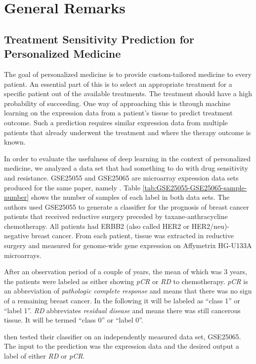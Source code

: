 
\section{General Remarks}

\subsection{Treatment Sensitivity Prediction for Personalized Medicine}

The goal of personalized medicine is to provide custom-tailored medicine
to every patient. An essential part of this is to select an appropriate
treatment for a specific patient out of the available treatments.
The treatment should have a high probability of succeeding. One way
of approaching this is through machine learning on the expression
data from a patient's tissue to predict treatment outcome. Such a
prediction requires similar expression data from multiple patients
that already underwent the treatment and where the therapy outcome
is known.

In order to evaluate the usefulness of deep learning in the context
of personalized medicine, we analyzed a data set that had something
to do with drug sensitivity and resistance. GSE25055 and GSE25065
are microarray expression data sets produced for the same paper, namely
\cite{HatzisSymmans2011}. Table \ref{tab:GSE25055-GSE25065-sample-number}
shows the number of samples of each label in both data sets. The authors
used GSE25055 to generate a classifier for the prognosis of breast
cancer patients that received reductive surgery preceded by taxane-anthracycline
chemotherapy. All patients had ERBB2 (also called HER2 or HER2/neu)-negative
breast cancer. From each patient, tissue was extracted in reductive
surgery and measured for genome-wide gene expression on Affymetrix
HG-U133A microarrays. 

After an observation period of a couple of years, the mean of which
was 3 years, the patients were labeled as either showing \emph{pCR}
or \emph{RD} to chemotherapy. \emph{pCR }is an abbreviation
of \emph{pathologic complete response}
and means that there was no sign of a remaining breast cancer. In
the following it will be labeled as ``class 1'' or ``label 1''.
\emph{RD} abbreviates \emph{residual disease}
and means there was still cancerous tissue. It will be termed ``class
0'' or ``label 0''.

\cite{HatzisSymmans2011} then tested their classifier on an independently
measured data set, GSE25065. The input to the prediction was the expression
data and the desired output a label of either \emph{RD }or \emph{pCR}.


